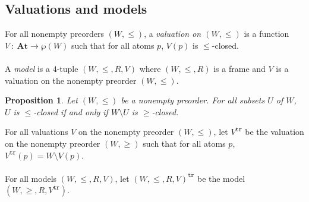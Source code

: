 \documentclass[draft]{article}
\newtheorem{proposition}{Proposition}
\def\At{\mathbf{At}}
\begin{document}
\subsection{Valuations and models}
%
%
%
%
%
%
For all nonempty preorders $(W,{\leq})$, a {\em valuation on $(W,{\leq})$}\/ is a function $V\ :\ \At{\longrightarrow}
%
%
%
%
%
%
%
$\linebreak$
%
%
%
%
%
%
\wp(W)$ such that for all atoms $p$, $V(p)$ is $\leq$-closed.
%
%
%
%
%
%
%
%
%
%
%
%
\\
\\
%
%
A {\em model}\/ is a $4$-tuple $(W,{\leq},{R},V)$ where $(W,{\leq},{R})$ is a frame and $V$ is a valuation on the nonempty preorder $(W,{\leq})$.
%
%
\begin{proposition}\label{Proposition:about:complement:and:closed:subsets}
%
%
Let $(W,{\leq})$ be a nonempty preorder.
For all subsets $U$ of $W$, $U$ is $\leq$-closed if and only if $W{\setminus}U$ is $\geq$-closed.
%
%
\end{proposition}
%
%
For all valuations $V$ on the nonempty preorder $(W,{\leq})$, let $V^{\mathtt{tr}}$ be the valuation on the nonempty preorder $(W,{\geq})$ such that for all atoms $p$, $V^{\mathtt{tr}}(p){=}W{\setminus}V(p)$.
%
%
\\
\\
%
%
For all models $(W,{\leq},{R},V)$, let $(W,{\leq},{R},V)^{\mathtt{tr}}$ be the model $(W,{\geq},{R},V^{\mathtt{tr}})$.
%
%
%
%
\end{document}
